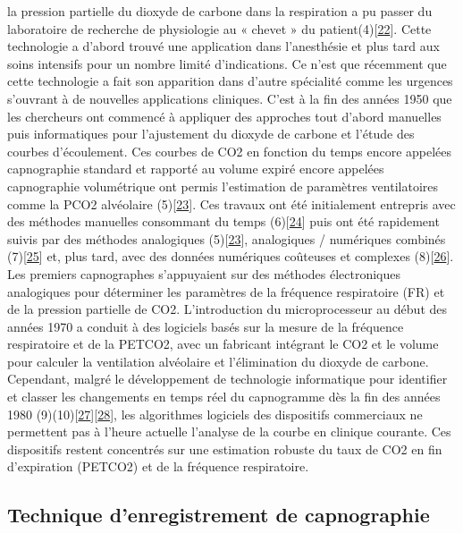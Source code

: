 \documentclass[12pt,]{article}
\begin{document}
la pression partielle du dioxyde de carbone dans la respiration a pu
passer du laboratoire de recherche de physiologie au « chevet » du
patient(4){[}\protect\hyperlink{ref-jaffe2008infrared}{22}{]}. Cette
technologie a d'abord trouvé une application dans l'anesthésie et plus
tard aux soins intensifs pour un nombre limité d'indications. Ce n'est
que récemment que cette technologie a fait son apparition dans d'autre
spécialité comme les urgences s'ouvrant à de nouvelles applications
cliniques. C'est à la fin des années 1950 que les chercheurs ont
commencé à appliquer des approches tout d'abord manuelles puis
informatiques pour l'ajustement du dioxyde de carbone et l'étude des
courbes d'écoulement. Ces courbes de CO2 en fonction du temps encore
appelées capnographie standard et rapporté au volume expiré encore
appelées capnographie volumétrique ont permis l'estimation de paramètres
ventilatoires comme la PCO2 alvéolaire
(5){[}\protect\hyperlink{ref-bellville1959respiratory}{23}{]}. Ces
travaux ont été initialement entrepris avec des méthodes manuelles
consommant du temps
(6){[}\protect\hyperlink{ref-berengo1961single}{24}{]} puis ont été
rapidement suivis par des méthodes analogiques
(5){[}\protect\hyperlink{ref-bellville1959respiratory}{23}{]},
analogiques / numériques combinés
(7){[}\protect\hyperlink{ref-murphy1899analogue}{25}{]} et, plus tard,
avec des données numériques coûteuses et complexes
(8){[}\protect\hyperlink{ref-noe1963computer}{26}{]}. Les premiers
capnographes s'appuyaient sur des méthodes électroniques analogiques
pour déterminer les paramètres de la fréquence respiratoire (FR) et de
la pression partielle de CO2. L'introduction du microprocesseur au début
des années 1970 a conduit à des logiciels basés sur la mesure de la
fréquence respiratoire et de la PETCO2, avec un fabricant intégrant le
CO2 et le volume pour calculer la ventilation alvéolaire et
l'élimination du dioxyde de carbone. Cependant, malgré le développement
de technologie informatique pour identifier et classer les changements
en temps réel du capnogramme dès la fin des années 1980
(9)(10){[}\protect\hyperlink{ref-bao1992expert}{27}{]}{[}\protect\hyperlink{ref-ventzas1994capnex}{28}{]},
les algorithmes logiciels des dispositifs commerciaux ne permettent pas
à l'heure actuelle l'analyse de la courbe en clinique courante. Ces
dispositifs restent concentrés sur une estimation robuste du taux de CO2
en fin d'expiration (PETCO2) et de la fréquence respiratoire.

\hypertarget{technique-denregistrement-de-capnographie}{%
\subsection{Technique d'enregistrement de
capnographie}\label{technique-denregistrement-de-capnographie}}
\end{document}
